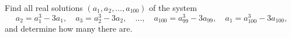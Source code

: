 Find all real solutions $(a_1,a_2,\dots,a_{100})$ of the system
\[
a_2=a_1^3-3a_1,\quad a_3=a_2^3-3a_2,\quad\dots,\quad a_{100}=a_{99}^3-3a_{99},\quad a_1=a_{100}^3-3a_{100},
\]
and determine how many there are.
